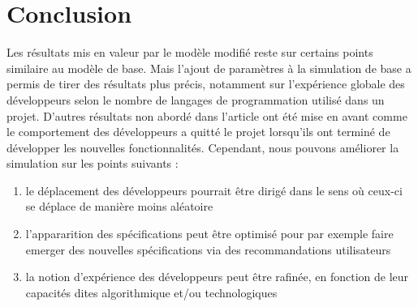\documentclass{article}
\begin{document}
\section{Conclusion}
Les résultats mis en valeur par le modèle modifié reste sur certains points similaire au modèle de base.
Mais l'ajout de paramètres à la simulation de base a permis de tirer des
résultats plus précis, notamment sur l'expérience globale des développeurs selon le nombre de langages de programmation
utilisé dans un projet. D'autres résultats non abordé dans l'article ont été mise en avant comme le comportement des développeurs
a quitté le projet lorsqu'ils ont terminé de développer les nouvelles fonctionnalités. Cependant, nous pouvons améliorer la simulation sur les
points suivants :
\begin{enumerate}
\item{le déplacement des développeurs pourrait être dirigé dans le sens où ceux-ci se déplace de manière moins aléatoire}
\item{l'appararition des spécifications peut être optimisé pour par exemple faire emerger des nouvelles spécifications via des recommandations utilisateurs}
\item{la notion d'expérience des développeurs peut être rafinée, en
    fonction de leur capacités dites algorithmique et/ou technologiques}
\end{enumerate}
\end{document}
